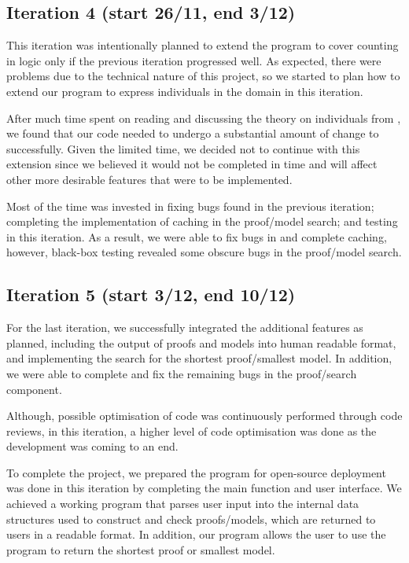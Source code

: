 \subsection*{Iteration 4 (start 26/11, end 3/12)}

This iteration was intentionally planned to extend the program to cover counting in logic only if the previous iteration progressed well. As expected, there were problems due to the technical nature of this project, so we started to plan how to extend our program to express individuals in the domain in this iteration.

After much time spent on reading and discussing the theory on individuals from \cite{Schmidt:2007:UTD:1785162.1785195}, we found that our code needed to undergo a substantial amount of change to successfully. Given the limited time, we decided not to continue with this extension since we believed it would not be completed in time and will affect other more desirable features that were to be implemented.

Most of the time was invested in fixing bugs found in the previous iteration; completing the implementation of caching in the proof/model search; and testing in this iteration. As a result, we were able to fix bugs in and complete caching, however, black-box testing revealed some obscure bugs in the proof/model search.

\subsection*{Iteration 5 (start 3/12, end 10/12)}

For the last iteration, we successfully integrated the additional features as planned, including the output of proofs and models into human readable format, and implementing the search for the shortest proof/smallest model. In addition, we were able to complete and fix the remaining bugs in the proof/search component.

Although, possible optimisation of code was continuously performed through code reviews, in this iteration, a higher level of code optimisation was done as the development was coming to an end.

To complete the project, we prepared the program for open-source deployment was done in this iteration by completing the main function and user interface. We achieved a working program that parses user input into the internal data structures used to construct and check proofs/models, which are returned to users in a readable format. In addition, our program allows the user to use the program to return the shortest proof or smallest model.


